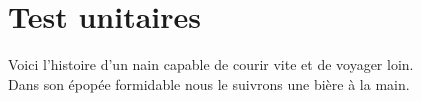\section{Test unitaires}
Voici l'histoire d'un nain capable de courir vite et de voyager loin.\\
Dans son épopée formidable nous le suivrons une bière à la main.\\
